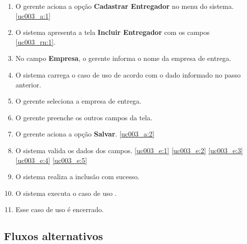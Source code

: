 \begin{enumerate}[label=P\arabic*]
	\item O gerente aciona a opção \textbf{Cadastrar Entregador} no menu do sistema. \label{uc003_p:1}\ref{uc003_a:1}
	\item O sistema apresenta a tela \textbf{Incluir Entregador} com os campos \ref{uc003_rn:1}.
	\item No campo \textbf{Empresa}, o gerente informa o nome da empresa de entrega. \label{uc003_p:3}
	\item O sistema carrega o caso de uso  de acordo com o dado informado no passo anterior.
	\item O gerente seleciona a empresa de entrega. \label{uc003_p:5}
	\item O gerente preenche os outros campos da tela. \label{uc003_p:6}	
	\item O gerente aciona a opção \textbf{Salvar}. \label{uc003_p:7}\ref{uc003_a:2}
	\item O sistema valida os dados dos campos. \ref{uc003_e:1} \ref{uc003_e:2} \ref{uc003_e:3} \ref{uc003_e:4} \ref{uc003_e:5}
	\item O sistema realiza a inclusão com sucesso.
	\item O sistema executa o caso de uso .
	\item Esse caso de uso é encerrado.	
\end{enumerate}

\subsection{Fluxos alternativos}

